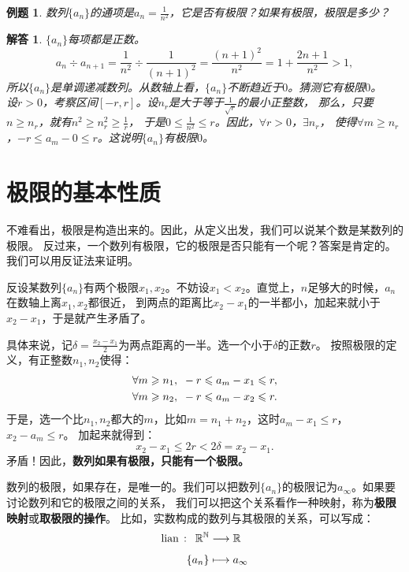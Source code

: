 \documentclass[12pt,UTF8]{ctexbook}
\newcommand\lian[1]{
    \underset{#1}{\operatorname{lian}\,}
}
\newtheorem{et}{例题}[section]
\newtheorem*{so}{解答}
\begin{document}
\begin{et}
数列$\{a_n\}$的通项是$a_n = \frac{1}{n^2}$，它是否有极限？如果有极限，极限是多少？    
\end{et}
\begin{so}
    $\{a_n\}$每项都是正数。
    $$a_{n} \div a_{n+1} = \frac{1}{n^2} \div \frac{1}{(n+1)^2} = \frac{(n+1)^2}{n^2} = 1 + \frac{2n+1}{n^2} > 1,$$
    所以$\{a_n\}$是单调递减数列。从数轴上看，$\{a_n\}$不断趋近于$0$。猜测它有极限$0$。\\
    设$r>0$，考察区间$[-r,r]$。设$n_r$是大于等于$\frac{1}{\sqrt{r}}$的最小正整数，
    那么，只要$n \geqslant n_r$，就有$n^2 \geqslant n_r^2 \geqslant \frac{1}{r}$，
    于是$0 \leqslant \frac{1}{n^2} \leqslant r$。因此，$\forall r > 0$，$\exists n_r$，
    使得$\forall m \geqslant n_r$，$ -r  \leqslant a_m - 0 \leqslant r$。这说明$\{a_n\}$有极限$0$。    
\end{so}

\section{极限的基本性质}
不难看出，极限是构造出来的。因此，从定义出发，我们可以说某个数是某数列的极限。
反过来，一个数列有极限，它的极限是否只能有一个呢？答案是肯定的。我们可以用反证法来证明。

反设某数列$\{a_n\}$有两个极限$x_1, x_2$。不妨设$x_1 < x_2$。直觉上，$n$足够大的时候，$a_n$在数轴上离$x_1, x_2$都很近，
到两点的距离比$x_2 - x_1$的一半都小，加起来就小于$x_2 - x_1$，于是就产生矛盾了。

具体来说，记$\delta = \frac{x_2 - x_1}{2}$为两点距离的一半。选一个小于$\delta$的正数$r$。
按照极限的定义，有正整数$n_1, n_2$使得：
\begin{align}
    \forall m \geqslant n_1 , \,\,\,& -r \leqslant a_m - x_1 \leqslant r , \notag \\
    \forall m \geqslant n_2 , \,\,\,& -r \leqslant a_m - x_2 \leqslant r . \notag 
\end{align}
于是，选一个比$n_1,n_2$都大的$m$，比如$m=n_1+n_2$，这时$a_m - x_1 \leqslant r$，$x_2 - a_m \leqslant r$。
加起来就得到：
$$x_2 - x_1 \leqslant 2r < 2\delta = x_2 - x_1.$$
矛盾！因此，\textbf{数列如果有极限，只能有一个极限。}

数列的极限，如果存在，是唯一的。我们可以把数列$\{a_n\}$的极限记为$a_\infty$。如果要讨论数列和它的极限之间的关系，
我们可以把这个关系看作一种映射，称为\textbf{极限映射}或\textbf{取极限的操作}。
比如，实数构成的数列与其极限的关系，可以写成：
\begin{align}
    \lian{} : \,\,\, \mathbb{R}^\mathbb{N} &\longrightarrow \mathbb{R} \notag \\
    \{a_n\} &\longmapsto a_\infty \notag
\end{align}
\end{document}
